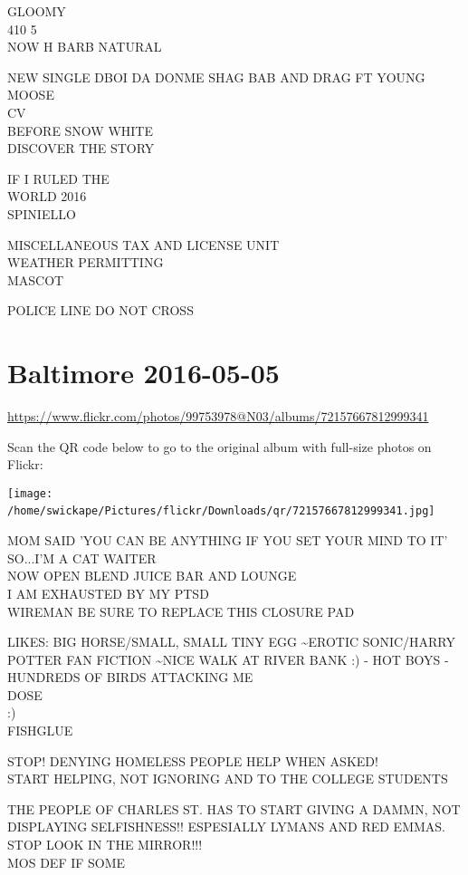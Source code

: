 \documentclass[10pt,letterpaper]{article}
\begin{document}
GLOOMY\\
410 5\\
NOW H BARB NATURAL

NEW SINGLE DBOI DA DONME SHAG BAB AND DRAG FT YOUNG MOOSE\\
CV\\
BEFORE SNOW WHITE\\
DISCOVER THE STORY

IF I RULED THE\\
WORLD 2016\\
SPINIELLO

MISCELLANEOUS TAX AND LICENSE UNIT\\
WEATHER PERMITTING\\
MASCOT

POLICE LINE DO NOT CROSS
\

\section*{Baltimore 2016-05-05}

\url{https://www.flickr.com/photos/99753978@N03/albums/72157667812999341}

Scan the QR code below to go to the original album with full-size photos on Flickr:

\texttt{[image: /home/swickape/Pictures/flickr/Downloads/qr/72157667812999341.jpg]}
\

MOM SAID 'YOU CAN BE ANYTHING IF YOU SET YOUR MIND TO IT' SO...I'M A CAT WAITER\\
NOW OPEN BLEND JUICE BAR AND LOUNGE\\
I AM EXHAUSTED BY MY PTSD\\
WIREMAN BE SURE TO REPLACE THIS CLOSURE PAD

LIKES: BIG HORSE/SMALL, SMALL TINY EGG \textasciitilde{}EROTIC SONIC/HARRY POTTER FAN FICTION \textasciitilde{}NICE WALK AT RIVER BANK :) {-} HOT BOYS {-} HUNDREDS OF BIRDS ATTACKING ME\\
DOSE\\
:)\\
FISHGLUE

STOP! DENYING HOMELESS PEOPLE HELP WHEN ASKED!\\
START HELPING, NOT IGNORING  AND TO THE COLLEGE STUDENTS

THE PEOPLE OF CHARLES ST. HAS TO START GIVING A DAMMN, NOT DISPLAYING SELFISHNESS!! ESPESIALLY LYMANS AND RED EMMAS.  STOP LOOK IN THE MIRROR!!!\\
MOS DEF IF SOME
\end{document}
